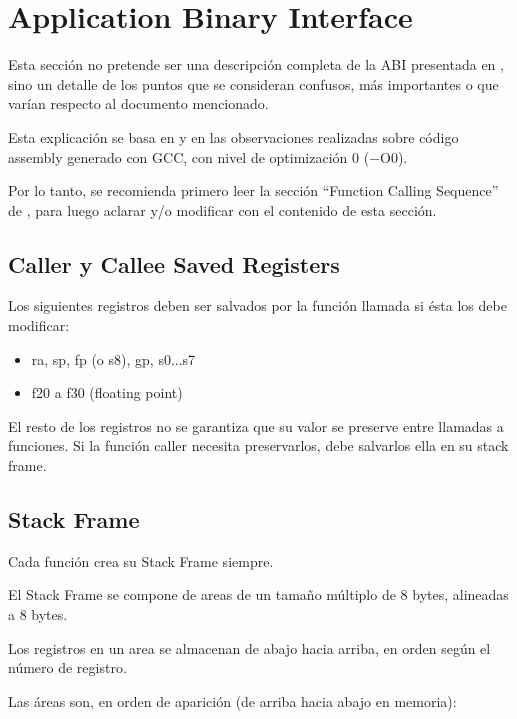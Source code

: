 \section{Application  Binary Interface}
Esta sección no pretende ser una descripción completa de la ABI presentada en \cite{abi}, sino un detalle de los puntos que se consideran confusos, más importantes o que varían respecto al documento mencionado.

Esta explicación se basa en \cite{abi} y en las observaciones realizadas sobre código assembly generado con GCC, con nivel de optimización 0 (−O0).

Por lo tanto, se recomienda primero leer la sección “Function Calling Sequence” de \cite{abi}, para luego aclarar y/o modificar con el contenido de esta sección.

\subsection{Caller y Callee Saved Registers}
Los siguientes registros deben ser salvados por la función llamada si ésta los debe modificar:

\begin{itemize}
 \item ra, sp, fp (o s8), gp, s0...s7
 \item f20 a f30 (floating point)
\end{itemize}

El resto de los registros no se garantiza que su valor se preserve entre llamadas a funciones. Si la función caller necesita preservarlos, debe salvarlos ella en su stack frame.

\subsection{Stack Frame}
Cada función crea su Stack Frame siempre.

El Stack Frame se compone de areas de un tamaño múltiplo de 8 bytes, alineadas a 8 bytes.

Los registros en un area se almacenan de abajo hacia arriba, en orden según el número de registro.

Las áreas son, en orden de aparición (de arriba hacia abajo en memoria):


